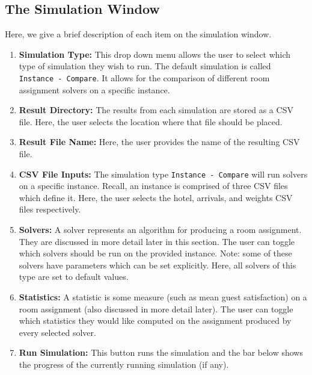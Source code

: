 \documentclass[11 pt]{article}
\begin{document}
\subsection{The Simulation Window}
Here, we give a brief description of each item on the simulation window.
\begin{enumerate}
    \item \textbf{Simulation Type:} This drop down menu allows the user to select which type of simulation they wish to run. The default simulation is called \texttt{Instance - Compare}. It allows for the comparison of different room assignment solvers on a specific instance.
    \item \textbf{Result Directory:} The results from each simulation are stored as a CSV file. Here, the user selects the location where that file should be placed.
    \item \textbf{Result File Name:} Here, the user provides the name of the resulting CSV file.
    \item \textbf{CSV File Inputs:} The simulation type \texttt{Instance - Compare} will run solvers on a specific instance. Recall, an instance is comprised of three CSV files which define it. Here, the user selects the hotel, arrivals, and weights CSV files respectively.
    \item \textbf{Solvers:} A solver represents an algorithm for producing a room assignment. They are discussed in more detail later in this section. The user can toggle which solvers should be run on the provided instance. Note: some of these solvers have parameters which can be set explicitly. Here, all solvers of this type are set to default values.
    \item \textbf{Statistics:} A statistic is some measure (such as mean guest satisfaction) on a room assignment (also discussed in more detail later). The user can toggle which statistics they would like computed on the assignment produced by every selected solver.
    \item \textbf{Run Simulation:} This button runs the simulation and the bar below shows the progress of the currently running simulation (if any).
\end{enumerate}
\end{document}
